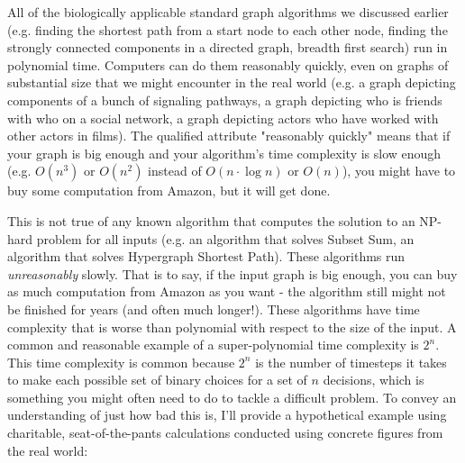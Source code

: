\documentclass[12pt,twoside]{reedthesis}
\begin{document}
	All of the biologically applicable standard graph algorithms we discussed earlier (e.g. finding the shortest path from a start node to each other node, finding the strongly connected components in a directed graph, breadth first search)  run in polynomial time. Computers can do them reasonably quickly, even on graphs of substantial size that we might encounter in the real world (e.g. a graph depicting components of a bunch of signaling pathways, a graph depicting who is friends with who on a social network, a graph depicting actors who have worked with other actors in films). The qualified attribute "reasonably quickly" means that if your graph is big enough and your algorithm's time complexity is slow enough (e.g. $O(n^3)$ or $O(n^2)$ instead of $O(n \cdot \log n)$ or $O(n)$), you might have to buy some computation from Amazon, but it will get done.\par This is not true of any known algorithm that computes the solution to an NP-hard problem for all inputs (e.g. an algorithm that solves Subset Sum, an algorithm that solves Hypergraph Shortest Path). These algorithms run \textit{unreasonably} slowly. That is to say, if the input graph is big enough, you can buy as much computation from Amazon as you want - the algorithm still might not be finished for years (and often much longer!). These algorithms have time complexity that is worse than polynomial with respect to the size of the input. A common and reasonable example of a super-polynomial time complexity is $2^n$. This time complexity is common because $2^n$ is the number of timesteps it takes to make each possible set of binary choices for a set of $n$ decisions, which is something you might often need to do to tackle a difficult problem. To convey an understanding of just how bad this is, I'll provide a hypothetical example using charitable, seat-of-the-pants calculations conducted using concrete figures from the real world:
\end{document}
